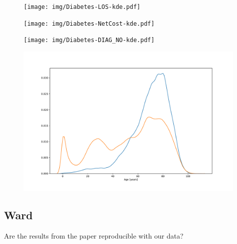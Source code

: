 \documentclass{article}
\begin{document}
\begin{figure}[h]
    \centering
    \begin{minipage}{.45\textwidth}
    \centering
    \texttt{[image: img/Diabetes-LOS-kde.pdf]}
    \label{fig:diabetes-LOS-kde-plot}
    \end{minipage}%
    \hspace{0.5cm}
    \begin{minipage}{.45\textwidth}
    \centering
    \texttt{[image: img/Diabetes-NetCost-kde.pdf]}
    \label{fig:diabetes-NetCost-kde-plot}
    \end{minipage}
    \begin{minipage}{.45\textwidth}
    \centering
    \texttt{[image: img/Diabetes-DIAG\_NO-kde.pdf]}
    \label{fig:diabetes-DIAG_NO-kde-plot}
    \end{minipage}%
    \hspace{0.5cm}
    \begin{minipage}{.45\textwidth}
    \centering
    \includegraphics[width=\linewidth]{img/Diabetes-Age-kde.pdf}
    \label{fig:diabetes-Age-kde-plot}
    \end{minipage}
\end{figure}


\subsection{Ward}\label{subsec:ward}

Are the results from the paper reproducible with our data?


\end{document}
